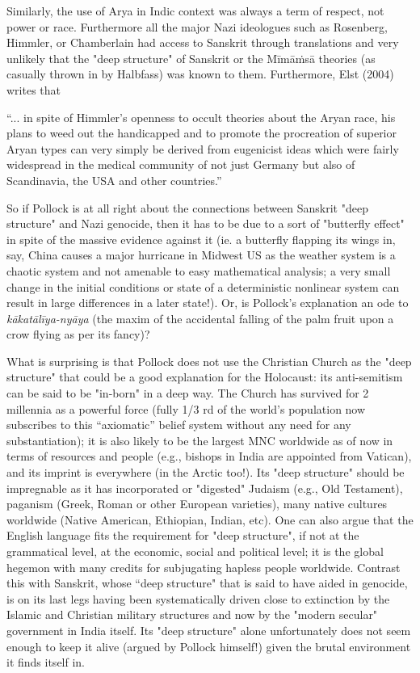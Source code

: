 Similarly, the use of Arya in Indic context was always a term of respect, not power or race. Furthermore all the major Nazi ideologues such as Rosenberg, Himmler, or Chamberlain had access to Sanskrit through translations and very unlikely that the "deep structure" of Sanskrit or the Mīmāṁsā theories (as casually thrown in by Halbfass) was known to them. Furthermore, Elst (2004) writes that 

\begin{myquote}
“... in spite of Himmler's openness to occult theories about the Aryan race, his plans to weed out the handicapped and to promote the procreation of superior Aryan types can very simply be derived from eugenicist ideas which were fairly widespread in the medical community of not just Germany but also of Scandinavia, the USA and other countries.”
\end{myquote}

So if Pollock is at all right about the connections between Sanskrit "deep structure" and Nazi genocide, then it has to be due to a sort of "butterfly effect" in spite of the massive evidence against it (ie. a butterfly flapping its wings in, say, China causes a major hurricane in Midwest US as the weather system is a chaotic system and not amenable to easy mathematical analysis; a very small change in the initial conditions or state of a deterministic nonlinear system can result in large differences in a later state!). Or, is Pollock's explanation an ode to {\sl kākatālīya-nyāya} (the maxim of the accidental falling of the palm fruit upon a crow flying as per its fancy)?

What is surprising is that Pollock does not use the Christian Church as the "deep structure" that could be a good explanation for the Holocaust: its anti-semitism can be said to be "in-born" in a deep way. The Church has survived for 2 millennia as a powerful force (fully 1/3 rd of the world's population now subscribes to this “axiomatic” belief system without any need for any substantiation); it is also likely to be the largest MNC worldwide as of now in terms of resources and people (e.g., bishops in India are appointed from Vatican), and its imprint is everywhere (in the Arctic too!). Its "deep structure" should be impregnable as it has incorporated or "digested" Judaism (e.g., Old Testament), paganism (Greek, Roman or other European varieties), many native cultures worldwide (Native American, Ethiopian, Indian, etc). One can also argue that the English language fits the requirement for "deep structure", if not at the grammatical level, at the economic, social and political level; it is the global hegemon with many credits for subjugating hapless people worldwide. Contrast this with Sanskrit, whose “deep structure" that is said to have aided in genocide, is on its last legs having been systematically driven close to extinction by the Islamic and Christian military structures and now by the "modern secular" government in India itself. Its "deep structure" alone unfortunately does not seem enough to keep it alive (argued by Pollock himself!) given the brutal environment it finds itself in.

